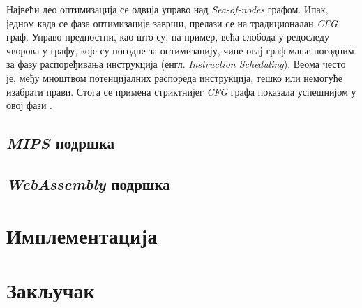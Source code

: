 \documentclass[12pt,oneside]{memoir}
\begin{document}
Највећи део оптимизација се одвија управо над \textit{Sea-of-nodes} графом. Ипак, једном када се фаза оптимизације заврши, прелази се на традиционалан \textit{CFG} граф.
Управо предностни, као што су, на пример, већа слобода у редоследу чворова у графу, које су погодне за оптимизацију, чине овај граф мање погодним за фазу распоређивања
инструкција (енгл. \textit{Instruction Scheduling}). Веома често је, међу мноштвом потенцијалних распореда инструкција, тешко или немогуће изабрати прави. Стога се примена стриктнијег \textit{CFG}
графа показала успешнијом у овој фази \cite{TFJIT}.

\section{\textit{MIPS} подршка} \label{chp:V8MIPS}

\section{\textit{WebAssembly} подршка} \label{chp:V8WASM}

\chapter{Имплементација}

\chapter{Закључак}

\literatura

\backmatter
\end{document}
